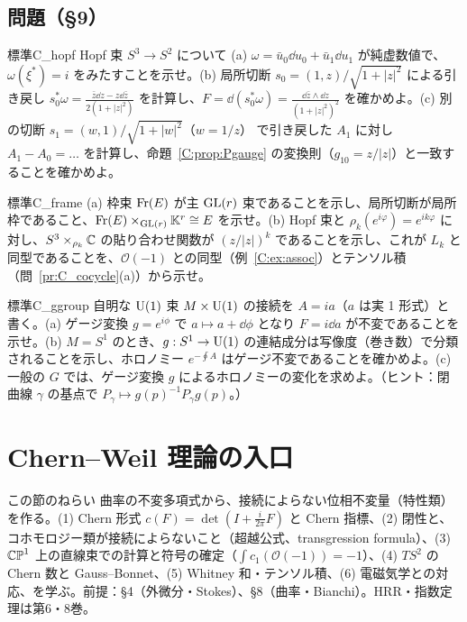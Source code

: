 \subsection*{問題（§9）}
\begin{probl}{標準}{C_hopf}
Hopf 束 $S^3\to S^2$ について (a) $\omega=\bar u_0\dd u_0+\bar u_1\dd u_1$ が純虚数値で、$\omega(\xi^*)=i$ をみたすことを示せ。(b) 局所切断 $s_0=(1,z)/\sqrt{1+|z|^2}$ による引き戻し $s_0^*\omega=\frac{\bar z\dd z-z\dd\bar z}{2(1+|z|^2)}$ を計算し、$F=\dd(s_0^*\omega)=\frac{\dd\bar z\wedge\dd z}{(1+|z|^2)^2}$ を確かめよ。(c) 別の切断 $s_1=(w,1)/\sqrt{1+|w|^2}$（$w=1/z$） で引き戻した $A_1$ に対し $A_1-A_0=\ldots$ を計算し、命題~\ref{C:prop:Pgauge} の変換則（$g_{10}=z/|z|$）と一致することを確かめよ。
\end{probl}
\begin{probl}{標準}{C_frame}
(a) 枠束 $\operatorname{Fr}(E)$ が主 $\mathrm{GL}(r)$ 束であることを示し、局所切断が局所枠であること、$\operatorname{Fr}(E)\times_{\mathrm{GL}(r)}\mathbb K^r\cong E$ を示せ。(b) Hopf 束と $\rho_k(e^{i\varphi})=e^{ik\varphi}$ に対し、$S^3\times_{\rho_k}\mathbb C$ の貼り合わせ関数が $(z/|z|)^k$ であることを示し、これが $L_k$ と同型であることを、$\mathcal O(-1)$ との同型（例~\ref{C:ex:assoc}）とテンソル積（問~\ref{pr:C_cocycle}(a)）から示せ。
\end{probl}
\begin{probl}{標準}{C_ggroup}
自明な $\mathrm{U}(1)$ 束 $M\times\mathrm{U}(1)$ の接続を $A=ia$（$a$ は実 1 形式）と書く。(a) ゲージ変換 $g=e^{i\phi}$ で $a\mapsto a+\dd\phi$ となり $F=i\dd a$ が不変であることを示せ。(b) $M=S^1$ のとき、$g:S^1\to\mathrm{U}(1)$ の連結成分は写像度（巻き数）で分類されることを示し、ホロノミー $e^{-\oint A}$ はゲージ不変であることを確かめよ。(c) 一般の $G$ では、ゲージ変換 $g$ によるホロノミーの変化を求めよ。（ヒント：閉曲線 $\gamma$ の基点で $P_\gamma\mapsto g(p)^{-1}P_\gamma g(p)$。）
\end{probl}

\section{Chern--Weil 理論の入口}
\label{C:sec10}
\begin{goalbox}{この節のねらい}
曲率の不変多項式から、接続によらない位相不変量（特性類）を作る。(1) Chern 形式 $c(F)=\det(I+\frac i{2\pi}F)$ と Chern 指標、(2) 閉性と、コホモロジー類が接続によらないこと（超越公式、transgression formula）、(3) $\mathbb{CP}^1$ 上の直線束での計算と符号の確定（$\int c_1(\mathcal O(-1))=-1$）、(4) $TS^2$ の Chern 数と Gauss--Bonnet、(5) Whitney 和・テンソル積、(6) 電磁気学との対応、を学ぶ。前提：§4（外微分・Stokes）、§8（曲率・Bianchi）。HRR・指数定理は第6・8巻。
\end{goalbox}

